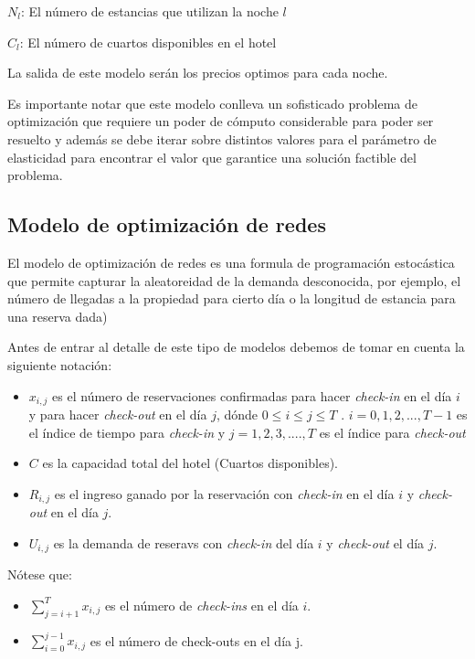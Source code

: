{$N_l$: El número de estancias que utilizan la noche $l$

$C_l$: El número de cuartos disponibles en el hotel

La salida de este modelo serán los precios optimos para cada noche. 

Es importante notar que este modelo conlleva un sofisticado problema de optimización que requiere un poder de cómputo considerable para poder ser resuelto y además se debe iterar sobre distintos valores para el parámetro de elasticidad para encontrar el valor que garantice una solución factible del problema.



 \subsection*{Modelo de optimización de redes}

El modelo de optimización de redes es una formula de programación estocástica que permite capturar la aleatoreidad de la demanda desconocida, por ejemplo, el número de llegadas a la propiedad para cierto día o la longitud de estancia para una reserva dada)

Antes de entrar al detalle de este tipo de modelos debemos de tomar en cuenta la siguiente notación:

\begin{itemize}
  \item $x_{i,j}$ es el número de reservaciones confirmadas para hacer \emph{check-in} en el día $i$ y para hacer \emph{check-out} en el día $j$, dónde $0\leq i \leq j \leq T$ . $i={0,1,2,...,T-1}$ es el índice de tiempo para \emph{check-in} y $j={1,2,3,....,T}$ es el índice para \emph{check-out}
  \item $C$ es la capacidad total del hotel (Cuartos disponibles).
  \item $R_{i,j}$ es el ingreso ganado por la reservación con \emph{check-in} en el día $i$ y \emph{check-out} en el día $j$.
  \item $U_{i,j}$ es la demanda de reseravs con \emph{check-in} del día $i$ y \emph{check-out} el día $j$.
\end{itemize}

Nótese que:

\begin{itemize}
  \item $\sum_{j=i+1}^{T} x_{i,j}$ es el número de \emph{check-ins} en el día $i$.
  \item $\sum_{i=0}^{j-1} x_{i,j}$ es el número de check-outs en el día j.
\end{itemize}

}
